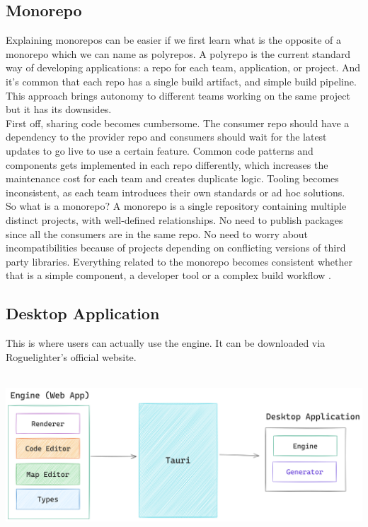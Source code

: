 \documentclass{article}
\begin{document}
\subsection{Monorepo}
Explaining monorepos can be easier if we first learn what is the opposite of a monorepo which we can name as polyrepos. A polyrepo is the current standard way of developing applications: a repo for each team, application, or project. And it's common that each repo has a single build artifact, and simple build pipeline. This approach brings autonomy to different teams working on the same project but it has its downsides.\\

First off, sharing code becomes cumbersome. The consumer repo should have a dependency to the provider repo and consumers should wait for the latest updates to go live to use a certain feature. Common code patterns and components gets implemented in each repo differently, which increases the maintenance cost for each team and creates duplicate logic. Tooling becomes inconsistent, as each team introduces their own standards or ad hoc solutions.\\

So what is a monorepo? A monorepo is a single repository containing multiple distinct projects, with well-defined relationships. No need to publish packages since all the consumers are in the same repo. No need to worry about incompatibilities because of projects depending on conflicting versions of third party libraries. Everything related to the monorepo becomes consistent whether that is a simple component, a developer tool or a complex build workflow \cite{monorepo}.

\subsection{Desktop Application}
This is where users can actually use the engine. It can be downloaded via Roguelighter's official website. \\\\
\begin{minipage}{\linewidth}
    \centering
    \includegraphics[width=1\textwidth]{pipeline.png}
\end{minipage}\\\\
\end{document}
